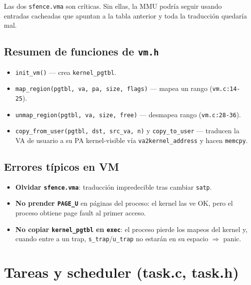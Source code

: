 \documentclass[11pt,a4paper]{article}
\begin{document}
Las dos \texttt{sfence.vma} son críticas. Sin ellas, la MMU podría
seguir usando entradas cacheadas que apuntan a la tabla anterior y
toda la traducción quedaría mal.

\subsection*{Resumen de funciones de \texttt{vm.h}}

\begin{itemize}[leftmargin=*,nosep]
    \item \texttt{init\_vm()} — crea \texttt{kernel\_pgtbl}.
    \item \texttt{map\_region(pgtbl, va, pa, size, flags)} — mapea
        un rango (\texttt{vm.c:14-25}).
    \item \texttt{unmap\_region(pgtbl, va, size, free)} — desmapea
        rango (\texttt{vm.c:28-36}).
    \item \texttt{copy\_from\_user(pgtbl, dst, src\_va, n)} y
        \texttt{copy\_to\_user} — traducen la VA de usuario a su PA
        kernel-visible vía \texttt{va2kernel\_address} y hacen
        \texttt{memcpy}.
\end{itemize}

\subsection*{Errores típicos en VM}

\begin{itemize}[leftmargin=*,nosep]
    \item \textbf{Olvidar \texttt{sfence.vma}}: traducción
        impredecible tras cambiar \texttt{satp}.
    \item \textbf{No prender \texttt{PAGE\_U}} en páginas del
        proceso: el kernel las ve OK, pero el proceso obtiene page
        fault al primer acceso.
    \item \textbf{No copiar \texttt{kernel\_pgtbl} en
        \texttt{exec}}: el proceso pierde los mapeos del kernel y,
        cuando entre a un trap, \texttt{s\_trap}/\texttt{u\_trap}
        no estarán en su espacio $\Rightarrow$ panic.
\end{itemize}

\section{Tareas y scheduler (task.c, task.h)}
\end{document}
